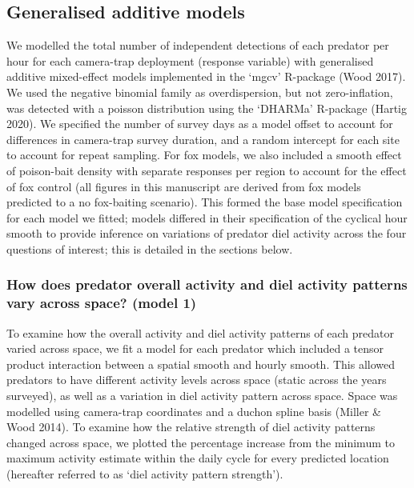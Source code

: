 \documentclass[11pt,a4paper,titlepage,twoside,openright]{style/unimelbthesis}
\begin{document}
\begin{mainmatter}
{\subsection{Generalised additive models}\label{generalised-additive-models-5}}

We modelled the total number of independent detections of each predator per hour for each camera-trap deployment (response variable) with generalised additive mixed-effect models implemented in the `mgcv' R-package (Wood 2017). We used the negative binomial family as overdispersion, but not zero-inflation, was detected with a poisson distribution using the `DHARMa' R-package (Hartig 2020). We specified the number of survey days as a model offset to account for differences in camera-trap survey duration, and a random intercept for each site to account for repeat sampling. For fox models, we also included a smooth effect of poison-bait density with separate responses per region to account for the effect of fox control (all figures in this manuscript are derived from fox models predicted to a no fox-baiting scenario). This formed the base model specification for each model we fitted; models differed in their specification of the cyclical hour smooth to provide inference on variations of predator diel activity across the four questions of interest; this is detailed in the sections below.

\hypertarget{how-does-predator-overall-activity-and-diel-activity-patterns-vary-across-space-model-1}{%
\subsubsection{How does predator overall activity and diel activity patterns vary across space? (model 1)}\label{how-does-predator-overall-activity-and-diel-activity-patterns-vary-across-space-model-1}}

To examine how the overall activity and diel activity patterns of each predator varied across space, we fit a model for each predator which included a tensor product interaction between a spatial smooth and hourly smooth. This allowed predators to have different activity levels across space (static across the years surveyed), as well as a variation in diel activity pattern across space. Space was modelled using camera-trap coordinates and a duchon spline basis (Miller \& Wood 2014). To examine how the relative strength of diel activity patterns changed across space, we plotted the percentage increase from the minimum to maximum activity estimate within the daily cycle for every predicted location (hereafter referred to as `diel activity pattern strength').


\end{mainmatter}
\end{document}

